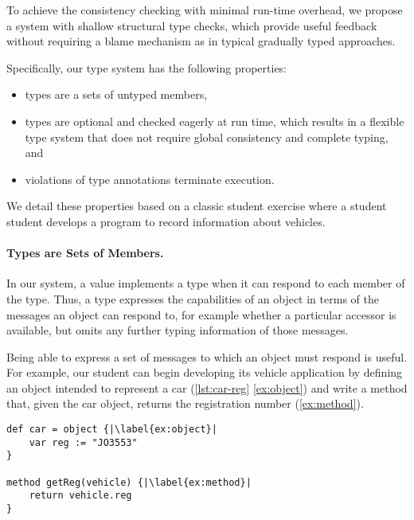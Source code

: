 To achieve the consistency checking with minimal run-time overhead,
we propose a system with shallow structural type checks,
which provide useful feedback without requiring a blame mechanism
as in typical gradually typed approaches.


Specifically, our type system has the following properties:

\begin{itemize}
  \item types are a sets of untyped members,
  \item types are optional and checked eagerly at run time,
        which results in a flexible type system that does not require global
        consistency and complete typing, and
  \item violations of type annotations terminate execution.
\end{itemize}


We detail these properties
based on a classic student exercise where a student student develops
a program to record information about vehicles.

\paragraph{Types are Sets of Members.}

In our system, a value implements a type when it
can respond to each member of the type.
Thus, a type expresses the capabilities
of an object in terms of the messages an object
can respond to, for example whether a particular accessor is
available, but omits any further typing information of those messages.

Being able to express a set of messages to which an object
must respond is useful. For example, our student can begin
developing its vehicle application
by defining an object
intended to represent a car (\cref{lst:car-reg} \cref{ex:object}) and write a method that, 
given the car object,
returns the registration number (\cref{ex:method}).

\begin{lstlisting}[caption={The start of a simple program for tracking vehicle information.},label=lst:car-reg,escapechar=|]
def car = object {|\label{ex:object}|
    var reg := "JO3553"
}

method getReg(vehicle) {|\label{ex:method}|
    return vehicle.reg
}
\end{lstlisting}

